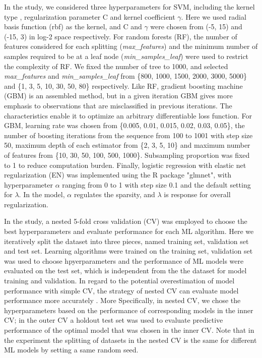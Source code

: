       In the study, we considered three hyperparameters for SVM, including the kernel type , regularization parameter C and kernel coefficient $\gamma$. Here we used radial basis function (rbf) as the kernel, and C and $\gamma$ were chosen from (-5, 15) and (-15, 3) in log-2 space respectively. For random forests (RF), the number of features considered for each splitting (\textit{max\_features}) and the minimum number of samples required to be at a leaf node (\textit{min\_samples\_leaf}) were used to restrict the complexity of RF. We fixed the number of tree to 1000, and selected \textit{max\_features} and \textit{min\_samples\_leaf} from \{800, 1000, 1500, 2000, 3000, 5000\} and \{1, 3, 5, 10, 30, 50, 80\} respectively. Like RF, gradient boosting machine (GBM) is an assembled method, but in a given iteration GBM gives more emphasis to observations that are misclassified in previous iterations. The characteristics enable it to optimize an arbitrary differentiable loss function. For GBM, learning rate was chosen from \{0.005, 0.01, 0.015, 0.02, 0.03, 0.05\}, the number of boosting iterations from the sequence from 100 to 1001 with step size 50, maximum depth of each estimator from \{2, 3, 5, 10\} and maximum number of features from \{10, 30, 50, 100, 500, 1000\}. Subsampling proportion was fixed to 1 to reduce computation burden. Finally, logistic regression with elastic net regularization (EN) was implemented using the R package "glmnet", with hyperparameter $\alpha$ ranging from 0 to 1 with step size 0.1 and the default setting for $\lambda$. In the model, $\alpha$ regulates the sparsity, and $\lambda$ is response for overall regularization. 
  
      In the study, a nested 5-fold cross validation (CV) was employed to choose the best hyperparameters and evaluate performance for each ML algorithm. Here we iteratively split the dataset into three pieces, named training set, validation set and test set. Learning algorithms were trained on the training set, validation set was used to choose hpyerparameters and the performance of ML models were evaluated on the test set, which is independent from the the dataset for model training and validation. In regard to the potential overestimation of model performance with simple CV, the strategy of nested CV can evaluate model performance more accurately \cite{varma2006bias}. More Specifically, in nested CV, we chose the hyperparameters based on the performance of corresponding models in the inner CV; in the outer CV a holdout test set was used to evaluate predictive performance of the optimal model that was chosen in the inner CV. Note that in the experiment the splitting of datasets in the nested CV is the same for different ML models by setting a same random seed. 
  
